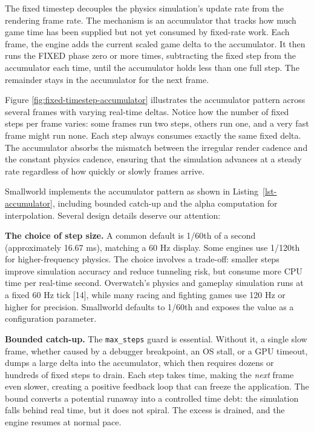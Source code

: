 \documentclass[
  11pt,
  letterpaper,
  DIV=11,
  numbers=noendperiod,
  twoside,
  open=right]{scrreprt}
\newcounter{none} %
\begin{document}
The fixed timestep decouples the physics simulation's update rate from
the rendering frame rate. The mechanism is an accumulator that tracks
how much game time has been supplied but not yet consumed by fixed-rate
work. Each frame, the engine adds the current scaled game delta to the
accumulator. It then runs the FIXED phase zero or more times,
subtracting the fixed step from the accumulator each time, until the
accumulator holds less than one full step. The remainder stays in the
accumulator for the next frame.

Figure \ref{fig:fixed-timestep-accumulator} illustrates the accumulator
pattern across several frames with varying real-time deltas. Notice how
the number of fixed steps per frame varies: some frames run two steps,
others run one, and a very fast frame might run none. Each step always
consumes exactly the same fixed delta. The accumulator absorbs the
mismatch between the irregular render cadence and the constant physics
cadence, ensuring that the simulation advances at a steady rate
regardless of how quickly or slowly frames arrive.



Smallworld implements the accumulator pattern as shown in
Listing~\ref{lst-accumulator}, including bounded catch-up and the alpha
computation for interpolation. Several design details deserve our
attention:

\textbf{The choice of step size.} A common default is 1/60th of a second
(approximately 16.67 ms), matching a 60 Hz display. Some engines use
1/120th for higher-frequency physics. The choice involves a trade-off:
smaller steps improve simulation accuracy and reduce tunneling risk, but
consume more CPU time per real-time second. Overwatch's physics and
gameplay simulation runs at a fixed 60 Hz tick {[}14{]}, while many
racing and fighting games use 120 Hz or higher for precision. Smallworld
defaults to 1/60th and exposes the value as a configuration parameter.

\textbf{Bounded catch-up.} The \texttt{max\_steps} guard is essential.
Without it, a single slow frame, whether caused by a debugger
breakpoint, an OS stall, or a GPU timeout, dumps a large delta into the
accumulator, which then requires dozens or hundreds of fixed steps to
drain. Each step takes time, making the \emph{next} frame even slower,
creating a positive feedback loop that can freeze the application. The
bound converts a potential runaway into a controlled time debt: the
simulation falls behind real time, but it does not spiral. The excess is
drained, and the engine resumes at normal pace.
\end{document}

